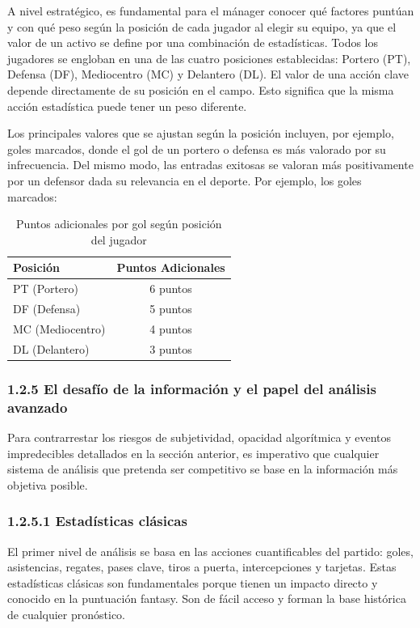 A nivel estratégico, es fundamental para el mánager conocer qué factores puntúan y con qué peso 
según la posición de cada jugador al elegir su equipo, ya que el valor de un activo se define por 
una combinación de estadísticas.
Todos los jugadores se engloban en una de las cuatro posiciones establecidas: Portero (PT), Defensa 
(DF), Mediocentro (MC) y Delantero (DL).
El valor de una acción clave depende directamente de su posición en el campo.
Esto significa que la misma acción estadística puede tener un peso diferente.

Los principales valores que se ajustan según la posición incluyen, por ejemplo, goles marcados, donde 
el gol de un portero o defensa es más valorado por su infrecuencia.
Del mismo modo, las entradas exitosas se valoran más positivamente por un defensor dada su relevancia 
en el deporte.
Por ejemplo, los goles marcados:

\begin{table}[h]
\centering
\begin{tabular}{lc}
\toprule
\textbf{Posición} & \textbf{Puntos Adicionales} \\
\midrule
PT (Portero) & 6 puntos \\
DF (Defensa) & 5 puntos \\
MC (Mediocentro) & 4 puntos \\
DL (Delantero) & 3 puntos \\
\bottomrule
\end{tabular}
\caption{Puntos adicionales por gol según posición del jugador}\label{tab:goles_posicion}
\end{table}

\subsubsection{1.2.5 El desafío de la información y el papel del análisis avanzado}

Para contrarrestar los riesgos de subjetividad, opacidad algorítmica y eventos impredecibles detallados 
en la sección anterior, es imperativo que cualquier sistema de análisis que pretenda ser competitivo se 
base en la información más objetiva posible.

\subsubsection{1.2.5.1 Estadísticas clásicas}

El primer nivel de análisis se basa en las acciones cuantificables del partido: goles, asistencias, 
regates, pases clave, tiros a puerta, intercepciones y tarjetas.
Estas estadísticas clásicas son fundamentales porque tienen un impacto directo y conocido en la 
puntuación fantasy.
Son de fácil acceso y forman la base histórica de cualquier pronóstico.


